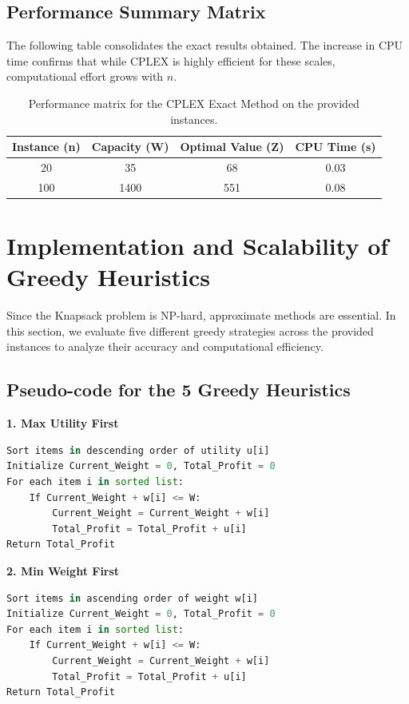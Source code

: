 \documentclass[11pt,a4paper]{article}
\begin{document}
\subsection{Performance Summary Matrix}
The following table consolidates the exact results obtained. The increase in CPU time confirms that while CPLEX is highly efficient for these scales, computational effort grows with $n$.

\begin{table}[htbp]
    \centering
    \begin{tabular}{|c|c|c|c|}
        \hline
        \textbf{Instance (n)} & \textbf{Capacity (W)} & \textbf{Optimal Value (Z)} & \textbf{CPU Time (s)} \\
        \hline
        20 & 35 & 68 & 0.03 \\
        \hline
        100 & 1400 & 551 & 0.08 \\
        \hline
    \end{tabular}
    \caption{Performance matrix for the CPLEX Exact Method on the provided instances.}
    \label{tab:cplex_matrix}
\end{table}
\section{Implementation and Scalability of Greedy Heuristics}

Since the Knapsack problem is NP-hard, approximate methods are essential. In this section, we evaluate five different greedy strategies across the provided instances to analyze their accuracy and computational efficiency.

\subsection{Pseudo-code for the 5 Greedy Heuristics}

\textbf{1. Max Utility First}
\begin{lstlisting}[language=Python, numbers=none, frame=none]
Sort items in descending order of utility u[i]
Initialize Current_Weight = 0, Total_Profit = 0
For each item i in sorted list:
    If Current_Weight + w[i] <= W:
        Current_Weight = Current_Weight + w[i]
        Total_Profit = Total_Profit + u[i]
Return Total_Profit
\end{lstlisting}

\textbf{2. Min Weight First}
\begin{lstlisting}[language=Python, numbers=none, frame=none]
Sort items in ascending order of weight w[i]
Initialize Current_Weight = 0, Total_Profit = 0
For each item i in sorted list:
    If Current_Weight + w[i] <= W:
        Current_Weight = Current_Weight + w[i]
        Total_Profit = Total_Profit + u[i]
Return Total_Profit
\end{lstlisting}
\end{document}

